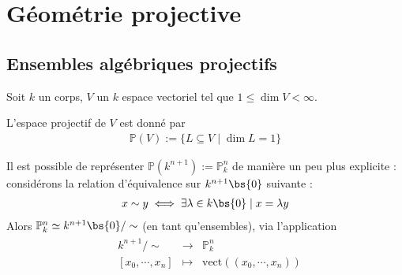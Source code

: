 \chapter{Géométrie projective}
    \section{Ensembles algébriques projectifs}
        Soit $k$ un corps, $V$ un $k$ espace vectoriel tel que $1 \leq \dim V < \infty$.
        \begin{defi}
            L'espace projectif de $V$ est donné par
            \begin{align*}
                \mathbb{P}(V) := \{L \subseteq V \mid \dim L = 1\}
            \end{align*}
        \end{defi}
        Il est possible de représenter $\mathbb{P}(k^{n+1}) := \mathbb{P}^n_k$ de manière un peu plus explicite : considérons la relation d'équivalence sur $k^{n+1} \bs \{0\}$ suivante : 
        \begin{align*}
            x \sim y \iff \exists \lambda \in k \bs \{0\} \mid x = \lambda y
        \end{align*}
        Alors $\mathbb{P}^n_k \simeq k^{n+1} \bs \{0\} /\sim$ (en tant qu'ensembles), via l'application
        \begin{align*}
            \begin{array}{cccc}
                & k^{n+1}/\sim & \to & \mathbb{P}^n_k \\
                & [x_0, \cdots, x_n] & \mapsto & \mathrm{vect}((x_0, \cdots, x_n))\\
            \end{array}
        \end{align*}
